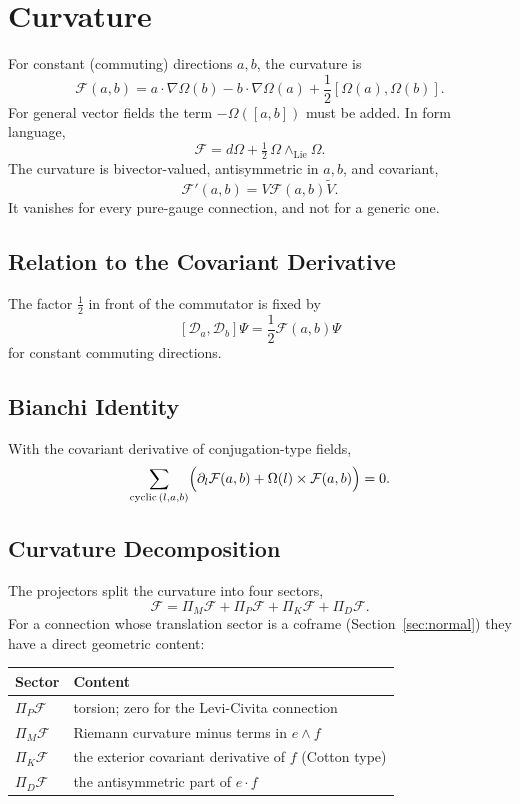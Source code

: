 \documentclass[11pt,a4paper]{article}
\newcommand{\D}{\mathcal{D}}
\newcommand{\F}{\mathcal{F}}
\newcommand{\Om}{\Omega}
\newcommand{\wedgeprod}{\mathbin{\wedge}}
\newcommand{\cross}{\mathbin{\times}}
\newcommand{\rev}[1]{\widetilde{#1}}
\begin{document}
\section{Curvature}

For constant (commuting) directions \(a,b\), the curvature is
\[
\boxed{
    \F(a,b)
    =
    a\cdot\nabla\Om(b)
    -
    b\cdot\nabla\Om(a)
    +
    \frac{1}{2}[\Om(a),\Om(b)].
}
\]
For general vector fields the term \(-\Om([a,b])\) must be added. In
form language,
\[
    \F=d\Om+\tfrac12\,\Om\wedge_{\mathrm{Lie}}\Om .
\]
The curvature is bivector-valued, antisymmetric in \(a,b\), and
covariant,
\[
    \F'(a,b)=V\F(a,b)\rev{V}.
\]
It vanishes for every pure-gauge connection, and not for a generic one.

\subsection{Relation to the Covariant Derivative}

The factor \(\tfrac12\) in front of the commutator is fixed by
\[
    \boxed{
        [\D_a,\D_b]\Psi
        =
        \frac{1}{2}\F(a,b)\Psi
    }
\]
for constant commuting directions.

\subsection{Bianchi Identity}

With the covariant derivative of conjugation-type fields,
\[
    \sum_{\mathrm{cyclic}\,(l,a,b)}
    \Bigl(
        \partial_l\F(a,b)+\Om(l)\cross\F(a,b)
    \Bigr)=0 .
\]

\subsection{Curvature Decomposition}

The projectors split the curvature into four sectors,
\[
    \F=\Pi_M\F+\Pi_P\F+\Pi_K\F+\Pi_D\F .
\]
For a connection whose translation sector is a coframe
(Section~\ref{sec:normal}) they have a direct geometric content:

\begin{center}
\begin{tabular}{ll}
    \toprule
    Sector & Content\\
    \midrule
    \(\Pi_P\F\) & torsion; zero for the Levi-Civita connection\\
    \(\Pi_M\F\) & Riemann curvature minus terms in \(e\wedgeprod f\)\\
    \(\Pi_K\F\) & the exterior covariant derivative of \(f\)
        (Cotton type)\\
    \(\Pi_D\F\) & the antisymmetric part of \(e\cdot f\)\\
    \bottomrule
\end{tabular}
\end{center}
\end{document}
